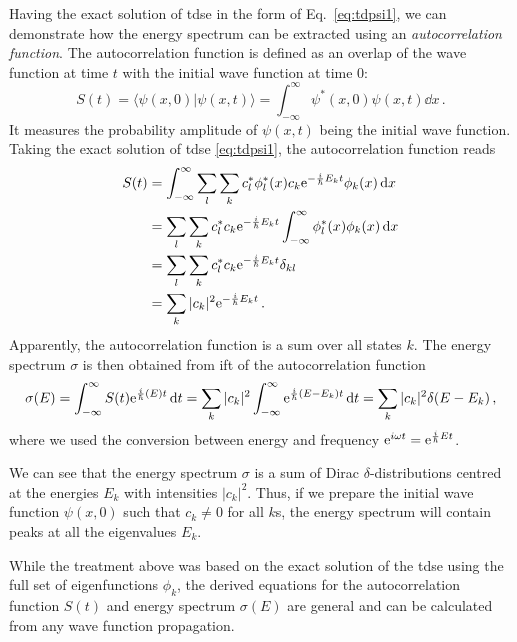 Having the exact solution of \acrshort{tdse} in the form of Eq.~\eqref{eq:tdpsi1}, we can demonstrate how the energy spectrum can be extracted using an \textit{autocorrelation function}. The autocorrelation function is defined as an overlap of the wave function at time $t$ with the initial wave function at time 0:
\begin{equation}
    S(t) = \langle \psi(x,0) | \psi(x,t) \rangle =\int_{-\infty}^{\infty}\psi^*(x,0) \psi(x,t) \dd x\, .
\end{equation}
It measures the probability amplitude of $\psi(x,t)$ being the initial wave function. Taking the exact solution of \acrshort{tdse} \eqref{eq:tdpsi1}, the autocorrelation function reads
\begin{align}
    S(t) &= \int_{-\infty}^{\infty} \sum_l \sum_k c_l^* \phi_l^*(x) c_k \mathrm{e}^{-\frac{i}{\hbar}E_k t}\phi_k(x) \mathop{}\!\mathrm{d} x \notag\\
    &= \sum_l \sum_k c^*_l c_k \mathrm{e}^{-\frac{i}{\hbar}E_k t} \int_{-\infty}^{\infty}  \phi_l^*(x) \phi_k(x) \mathop{}\!\mathrm{d} x \notag\\
    &= \sum_l \sum_k c^*_l c_k \mathrm{e}^{-\frac{i}{\hbar}E_k t} \delta_{kl} \notag\\
    &= \sum_k |c_k|^2 \mathrm{e}^{-\frac{i}{\hbar}E_k t} \, .
\end{align}
Apparently, the autocorrelation function is a sum over all states $k$. The energy spectrum $\sigma$ is then obtained from \acrshort{ift} of the autocorrelation function
\begin{equation}
    \sigma(E) = \int_{-\infty}^{\infty} S(t) \mathrm{e}^{\frac{i}{\hbar}(E)t} \mathop{}\!\mathrm{d} t  = \sum_k |c_k|^2 \int_{-\infty}^{\infty} \mathrm{e}^{\frac{i}{\hbar}(E-E_k)t} \mathop{}\!\mathrm{d} t = \sum_k |c_k|^2 \delta(E-E_k) \, ,
    \label{eq:autocorr1}
\end{equation}
where we used the conversion between energy and frequency $\mathrm{e}^{i\omega t} = \mathrm{e}^{\frac{i}{\hbar}Et}$.

We can see that the energy spectrum $\sigma$ is a sum of Dirac $\delta$-distributions centred at the energies $E_k$ with intensities $|c_k|^2$. Thus, if we prepare the initial wave function $\psi(x,0)$ such that $c_k\neq 0$ for all $k$s, the energy spectrum will contain peaks at all the eigenvalues $E_k$.

While the treatment above was based on the exact solution of the \acrshort{tdse} using the full set of eigenfunctions $\phi_k$, the derived equations for the autocorrelation function $S(t)$ and energy spectrum $\sigma(E)$ are general and can be calculated from any wave function propagation. 

